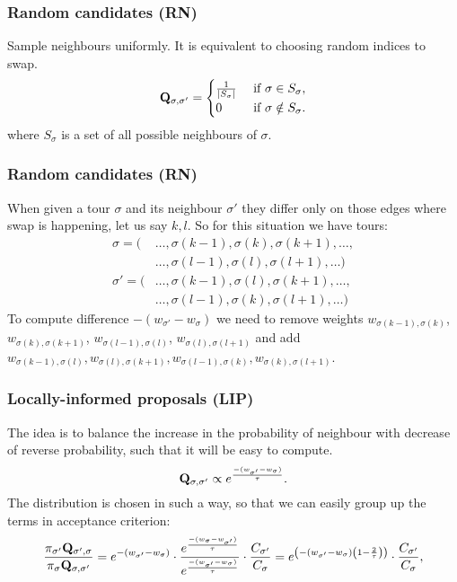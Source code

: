 \begin{frame}
	\frametitle{Random candidates (RN)}
	Sample neighbours uniformly. It is equivalent to choosing random indices to swap.
	\begin{equation*} \label{eq:PQ}
		\mathbf{Q}_{\sigma,\sigma'} = 
		\begin{cases}
		\frac{1}{|S_\sigma|} & \text{ if } \sigma \in S_\sigma, \\ 
		0 & \text{ if } \sigma \notin S_\sigma.
		\end{cases}
	\end{equation*} 
	where $S_\sigma$ is a set of all possible neighbours of $\sigma$.
\end{frame}

\begin{frame}
	\frametitle{Random candidates (RN)}
	When given a tour $\sigma$ and its neighbour $\sigma'$ they differ only on those edges where swap is happening, let us say $k,l$. So for this situation we have tours:
	\begin{align*}
		\sigma = (&\ldots, \sigma(k-1), \sigma(k), \sigma(k+1), \ldots, \\
		&\ldots, \sigma(l-1), \sigma(l), \sigma(l+1), \ldots) \\
		\sigma' = (&\ldots, \sigma(k-1), \sigma(l), \sigma(k+1), \ldots, \\
		&\ldots, \sigma(l-1), \sigma(k), \sigma(l+1), \ldots)
	\end{align*}
	To compute difference $-(w_{\sigma'}-w_\sigma)$ we need to remove weights $w_{\sigma(k-1), \sigma(k)}$, $w_{\sigma(k), \sigma(k+1)}$, $w_{\sigma(l-1), \sigma(l)}$, $w_{\sigma(l), \sigma(l+1)}$ and add $w_{\sigma(k-1), \sigma(l)}, w_{\sigma(l), \sigma(k+1)}, w_{\sigma(l-1), \sigma(k)}, w_{\sigma(k), \sigma(l+1)}$.
\end{frame}

\begin{frame}
	\frametitle{Locally-informed proposals (LIP)}
	The idea is to balance the increase in the probability of neighbour with decrease of reverse probability, such that it will be easy to compute.
	\begin{equation*}
		\mathbf{Q}_{\sigma,\sigma'} \propto e^\frac{-(w_{\sigma'} - w_\sigma)}{\tau}.
	\end{equation*}
	The distribution is chosen in such a way, so that we can easily group up the terms in acceptance criterion:
	\begin{equation*}
		\frac{\pi_{\sigma'} \mathbf{Q}_{\sigma',\sigma}}{\pi_\sigma \mathbf{Q}_{\sigma,\sigma'}} = e^{-(w_{\sigma'}-w_\sigma)} \cdot \frac{e^\frac{-(w_{\sigma} - w_{\sigma'})}{\tau}}{e^\frac{-(w_{\sigma'} - w_\sigma)}{\tau}} \cdot \frac{C_{\sigma'}}{C_\sigma} = e^{\left( -(w_{\sigma'}-w_\sigma) \left(1 - \frac{2}{\tau}\right) \right)} \cdot \frac{C_{\sigma'}}{C_\sigma},
	\end{equation*}
\end{frame}



